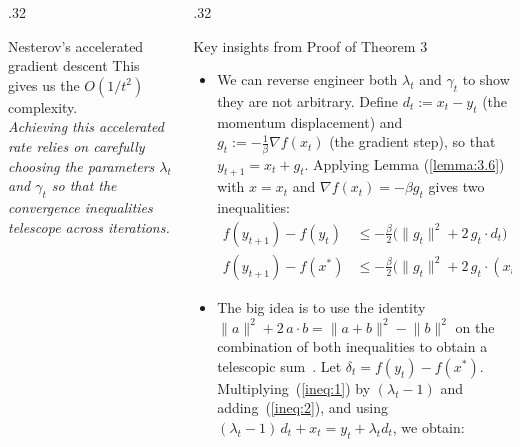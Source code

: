\documentclass[final,t]{beamer}
\newcommand{\norm}[2][]{#1\lVert #2 #1\rVert}
\begin{document}
\begin{frame}[containsverbatim]
\begin{columns}[t]
\begin{column}{.32\linewidth}
\begin{exampleblock}{Nesterov's accelerated gradient descent}
    This gives us the $O(1/t^2)$ complexity. \\
    \textit{Achieving this accelerated rate relies on carefully choosing the parameters
    $\lambda_t$ and $\gamma_t$ so that the convergence inequalities telescope across iterations.}
    \end{exampleblock}

    \end{column}



    \begin{column}{.32\linewidth}
    \vspace{-10mm}

    \begin{exampleblock}{Key insights from Proof of Theorem $3$}
    \begin{itemize}
      \item We can reverse engineer both $\lambda_t$ and $\gamma_t$ to
      show they are not arbitrary.
      Define $d_t := x_t - y_t$ (the momentum displacement) and
      $g_t := -\tfrac{1}{\beta}\nabla f(x_t)$ (the gradient step),
      so that $y_{t+1} = x_t + g_t$.
      Applying Lemma (\ref{lemma:3.6}) with $x = x_t$ and
      $\nabla f(x_t) = -\beta g_t$ gives two inequalities:
      \begin{align*}
        f(y_{t+1}) - f(y_t)
          &\leq -\frac{\beta}{2}\bigl(\norm{g_t}^2
            + 2\,g_t \cdot d_t\bigr)
          \tag{$\star$} \label{ineq:1} \\[4pt]
        f(y_{t+1}) - f(x^*)
          &\leq -\frac{\beta}{2}\bigl(\norm{g_t}^2
            + 2\,g_t \cdot (x_t - x^*)\bigr)
          \tag{$\star\!\star$} \label{ineq:2}
      \end{align*}
      \item The big idea is to use the identity
      $\norm{a}^2 + 2\,a \cdot b = \norm{a+b}^2 - \norm{b}^2$
      on the combination of both inequalities to obtain a telescopic
      sum~\parencite{BubeckUpdatePost}.
      Let $\delta_t = f(y_t) - f(x^*)$.
      Multiplying~(\ref{ineq:1}) by $(\lambda_t - 1)$ and
      adding~(\ref{ineq:2}), and using
      $(\lambda_t{-}1)\,d_t + x_t = y_t + \lambda_t d_t$, we obtain:

\end{itemize}
\end{exampleblock}
\end{column}
\end{columns}
\end{frame}
\end{document}
